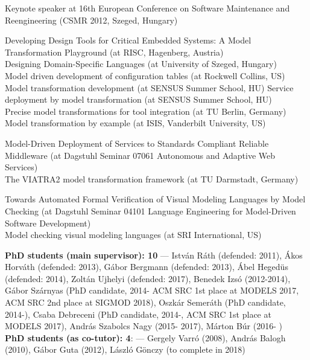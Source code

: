 \documentclass{xetexCV}
\begin{document}
Keynote speaker  at 16th European Conference on Software Maintenance
and Reengineering (CSMR 2012, Szeged, Hungary) 

Developing Design Tools for Critical Embedded Systems: A Model Transformation Playground
(at RISC, Hagenberg, Austria) \\

Designing Domain-Specific Languages (at University of Szeged, Hungary)
 \\

Model driven  development of configuration tables (at Rockwell Collins, US)
Model transformation development (at SENSUS Summer School, HU)
Service deployment by model transformation (at SENSUS Summer School, HU)
\\

Precise model transformations for tool integration (at TU Berlin, Germany)
 \\

Model transformation by example (at ISIS, Vanderbilt University, US)

Model-Driven Deployment of Services to Standards Compliant Reliable
Middleware (at Dagstuhl Seminar 07061 Autonomous and Adaptive Web Services)
\\

The VIATRA2 model transformation framework (at TU Darmstadt, Germany)

Towards Automated Formal Verification of Visual Modeling Languages
by Model Checking (at Dagstuhl Seminar 04101 Language Engineering for Model-Driven
Software Development) \\

Model checking visual modeling languages (at SRI International, US) 


\textbf{PhD students (main supervisor): 10} --- Istv\'an R\'ath (defended: 2011), \'Akos Horv\'ath (defended: 2013), G\'abor
Bergmann (defended: 2013), \'Abel Heged\"us (defended: 2014), Zolt\'an Ujhelyi (defended: 2017), 
Benedek Izs\'o (2012-2014), 
G\'abor Sz\'arnyas (PhD candidate, 2014- ACM SRC 1st place at MODELS 2017, ACM SRC 2nd place at SIGMOD 2018), Oszk\'ar Semer\'ath (PhD candidate, 2014-), Csaba Debreceni (PhD candidate, 2014-, ACM SRC 1st place at MODELS 2017), 
Andr\'as Szabolcs Nagy (2015- 2017), 
M\'arton B\'ur (2016- )\\

\textbf{PhD students (as co-tutor): 4}: --- Gergely Varr\'o (2008), Andr\'as Balogh (2010), G\'abor Guta (2012), L\'aszl\'o G\"onczy (to complete in 2018) \\
\end{document}
